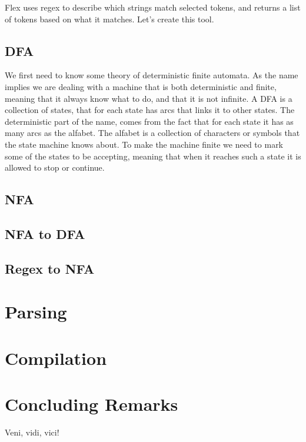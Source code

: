 \documentclass[a4paper,12pt]{report}
\begin{document}
Flex uses regex to describe which strings match selected tokens, and returns a list of tokens based on what it matches. Let's create this tool.

\section*{DFA}
We first need to know some theory of deterministic finite automata. As the name implies we are dealing with a machine that is both deterministic and finite, meaning that it always know what to do, and that it is not infinite. A DFA is a collection of states, that for each state has arcs that links it to other states. The deterministic part of the name, comes from the fact that for each state it has as many arcs as the alfabet. The alfabet is a collection of characters or symbols that the state machine knows about. To make the machine finite we need to mark some of the states to be accepting, meaning that when it reaches such a state it is allowed to stop or continue. 




\section*{NFA}

\section*{NFA to DFA}

\section*{Regex to NFA}

\chapter{Parsing}




\chapter{Compilation}


\chapter{Concluding Remarks}
Veni, vidi, vici!




\end{document}
